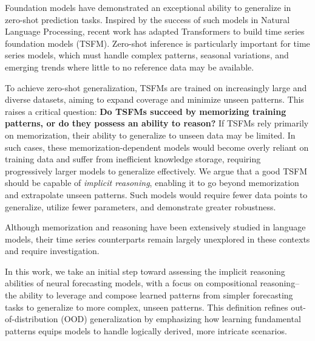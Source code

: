 Foundation models have demonstrated an exceptional ability to generalize in zero-shot prediction tasks. Inspired by the success of such models in Natural Language Processing, recent work has adapted Transformers to build time series foundation models (TSFM). Zero-shot inference is particularly important for time series models, which must handle complex patterns, seasonal variations, and emerging trends where little to no reference data may be available.

To achieve zero-shot generalization, TSFMs are trained on increasingly large and diverse datasets, aiming to expand coverage and minimize unseen patterns. This raises a critical question: \textbf{Do TSFMs succeed by memorizing training patterns, or do they possess an ability to reason?} If TSFMs rely primarily on memorization, their ability to generalize to unseen data may be limited. In such cases, these memorization-dependent models would become overly reliant on training data and suffer from inefficient knowledge storage, requiring progressively larger models to generalize effectively. We argue that a good TSFM should be capable of \emph{implicit reasoning}, enabling it to go beyond memorization and extrapolate unseen patterns. Such models would require fewer data points to generalize, utilize fewer parameters, and demonstrate greater robustness.

Although memorization and reasoning have been extensively studied in language models, their time series counterparts remain largely unexplored in these contexts and require investigation. 

In this work, we take an initial step toward assessing the implicit reasoning abilities of neural forecasting models, with a focus on compositional reasoning--the ability to leverage and compose learned patterns from simpler forecasting tasks to generalize to more complex, unseen patterns. This definition refines out-of-distribution (OOD) generalization by emphasizing how learning fundamental patterns equips models to handle logically derived, more intricate scenarios.

